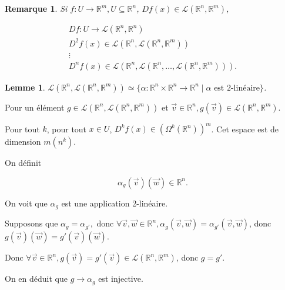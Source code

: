 \documentclass[french]{article}
\newtheorem*{remark}{Remarque}
\newtheorem*{lemma}{Lemme}
\begin{document}
\begin{remark}
  Si $f : U \to \mathbb{R}^m, U \subseteq \mathbb{R}^n$, $Df(x) \in \mathscr{L}(\mathbb{R}^n, \mathbb{R}^m) $,

  \begin{gather*}
    Df:U \to \mathscr{L}(\mathbb{R}^n, \mathbb{R}^n) \\
    D ^2 f(x) \in \mathscr{L}(\mathbb{R}^n, \mathscr{L}(\mathbb{R}^n, \mathbb{R}^m) ) \\
    \vdots \\
    D ^{n}f(x) \in \mathscr{L}(\mathbb{R}^n, \mathscr{L}(\mathbb{R}^n, \dots, \mathscr{L}(\mathbb{R}^n, \mathbb{R}^m) ) ) .
  \end{gather*}
\end{remark}

\begin{lemma}
  $\mathscr{L}(\mathbb{R}^n, \mathscr{L}(\mathbb{R}^n, \mathbb{R}^m) ) \simeq \{ \alpha : \mathbb{R}^n \times \mathbb{R}^n \to \mathbb{R}^n \mid \alpha \text{ est 2-linéaire} \}  $.
\end{lemma}

Pour un élément $g \in \mathscr{L}(\mathbb{R}^n, \mathscr{L}(\mathbb{R}^n, \mathbb{R}^m) ) $ et $\overrightarrow{ v } \in \mathbb{R}^n, g(\overrightarrow{ v } ) \in \mathscr{L}(\mathbb{R}^n, \mathbb{R}^m) $.

Pour tout $k$, pour tout $x \in U$, $D ^{k}f(x) \in (\Omega ^{k}(\mathbb{R}^n))^{m}$. Cet espace est de dimension $m(n ^{k})$.

On définit

\[
\alpha_g(\overrightarrow{ v } )(\overrightarrow{ w } ) \in \mathbb{R}^n.
\]

On voit que $\alpha _{g}$ est une application 2-linéaire.

Supposons que $\alpha_g = \alpha _{g'}, $ donc $ \forall \overrightarrow{ v }, \overrightarrow{ w } \in \mathbb{R}^n, \alpha _{g}(\overrightarrow{ v }, \overrightarrow{ w }) = \alpha _{g'}(\overrightarrow{ v }, \overrightarrow{ w }) $, donc $g(\overrightarrow{ v } )(\overrightarrow{ w } ) = g'(\overrightarrow{ v } )(\overrightarrow{ w } )$.

Donc $\forall \overrightarrow{ v } \in \mathbb{R}^n, g(\overrightarrow{ v } ) = g'(\overrightarrow{ v } ) \in \mathscr{L}(\mathbb{R}^n, \mathbb{R}^m)$, donc $g = g'$.

On en déduit que $g \longrightarrow \alpha_g$ est injective.
\end{document}
